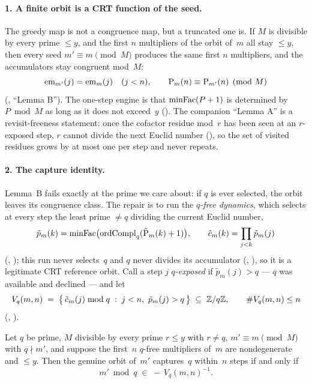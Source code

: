 \paragraph{1.  A finite orbit is a CRT function of the seed.}
The greedy map is not a congruence map, but a truncated one is.  If $M$ is
divisible by every prime $\le y$, and the first $n$ multipliers of the
orbit of~$m$ all stay $\le y$, then every seed $m' \equiv m \pmod M$
produces the same first $n$ multipliers, and the accumulators stay
congruent mod~$M$:
\[
  \mathrm{em}_{m'}(j) = \mathrm{em}_{m}(j) \quad (j<n),
  \qquad \mathrm{P}_{m}(n) \equiv \mathrm{P}_{m'}(n) \pmod M
\]
(, ``Lemma
B'').  The one-step engine is that $\mathrm{minFac}(P+1)$ is determined by
$P \bmod M$ as long as it does not exceed~$y$
().  The
companion ``Lemma A'' is a revisit-freeness statement: once the cofactor
residue mod~$r$ has been seen at an $r$-exposed step, $r$ cannot divide the
next Euclid number
(), so the
set of visited residues grows by at most one per step and never repeats.

\paragraph{2.  The capture identity.}
Lemma~B fails exactly at the prime we care about: if $q$ is ever selected,
the orbit leaves its congruence class.  The repair is to run the
\emph{$q$-free dynamics}, which selects at every step the least prime
$\neq q$ dividing the current Euclid number,
\[
  \tilde p_m(k) = \mathrm{minFac}\bigl(\mathrm{ordCompl}_q(\tilde{\mathrm{P}}_m(k)+1)\bigr),
  \qquad \tilde c_m(k) = \prod_{j<k} \tilde p_m(j)
\]
(,
); this run never
selects~$q$ and $q$ never divides its accumulator
(,
), so it is a
legitimate CRT reference orbit.  Call a step $j$ \emph{$q$-exposed} if
$\tilde p_m(j) > q$ --- $q$ was available and declined --- and let
\[
  V_q(m,n) \;=\; \bigl\{\, \tilde c_m(j) \bmod q \;:\; j<n,\ \tilde p_m(j) > q \,\bigr\}
  \;\subseteq\; \mathbb{Z}/q\mathbb{Z} ,
  \qquad \#V_q(m,n) \leq n
\]
(,
).

\begin{theorem}
\label{thm:capture-identity}
Let $q$ be prime, $M$ divisible by every prime $r \le y$ with $r \neq q$,
$m' \equiv m \pmod M$ with $q \nmid m'$, and suppose the first~$n$ $q$-free
multipliers of~$m$ are nondegenerate and $\le y$.  Then the genuine orbit
of~$m'$ captures~$q$ within~$n$ steps if and only if
\[
  m' \bmod q \;\in\; -\,V_q(m,n)^{-1} .
\]
\end{theorem}

